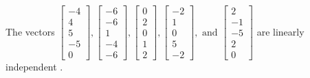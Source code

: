 \begin{exercise}
\begin{exerciseStatement}
  \end{exerciseStatement}
  \begin{exerciseAnswer}
   The vectors \(\left[\begin{array}{r}
-4 \\
4 \\
5 \\
-5 \\
0
\end{array}\right] , \left[\begin{array}{r}
-6 \\
-6 \\
1 \\
-4 \\
-6
\end{array}\right] , \left[\begin{array}{r}
0 \\
2 \\
0 \\
1 \\
2
\end{array}\right] , \left[\begin{array}{r}
-2 \\
1 \\
0 \\
5 \\
-2
\end{array}\right] , \text{ and } \left[\begin{array}{r}
2 \\
-1 \\
-5 \\
2 \\
0
\end{array}\right]\) are 
  	 linearly independent  .
  


  \end{exerciseAnswer}
\end{exercise}